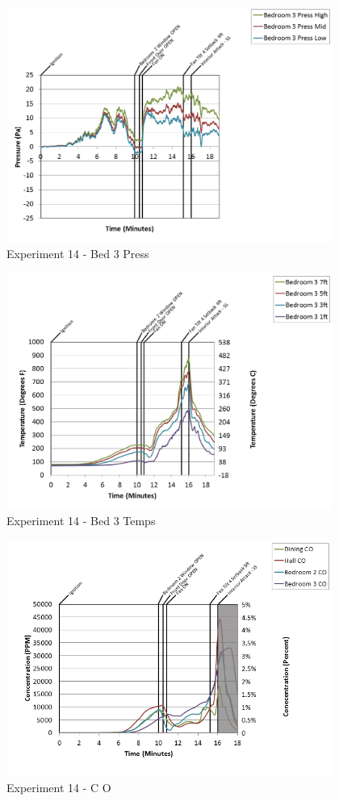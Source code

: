 \documentclass{article}
\begin{document}
\begin{appendices}
\begin{figure}[h!]
	\centering
	\includegraphics[height=3.05in]{0_Images/Results_Charts/Exp_14_Charts/Bed3Press.png}
	\caption{Experiment 14 - Bed 3 Press}
\end{figure}

\clearpage

\begin{figure}[h!]
	\centering
	\includegraphics[height=3.05in]{0_Images/Results_Charts/Exp_14_Charts/Bed3Temps.png}
	\caption{Experiment 14 - Bed 3 Temps}
\end{figure}


\begin{figure}[h!]
	\centering
	\includegraphics[height=3.05in]{0_Images/Results_Charts/Exp_14_Charts/CO.png}
	\caption{Experiment 14 - C O}
\end{figure}


\end{appendices}
\end{document}
